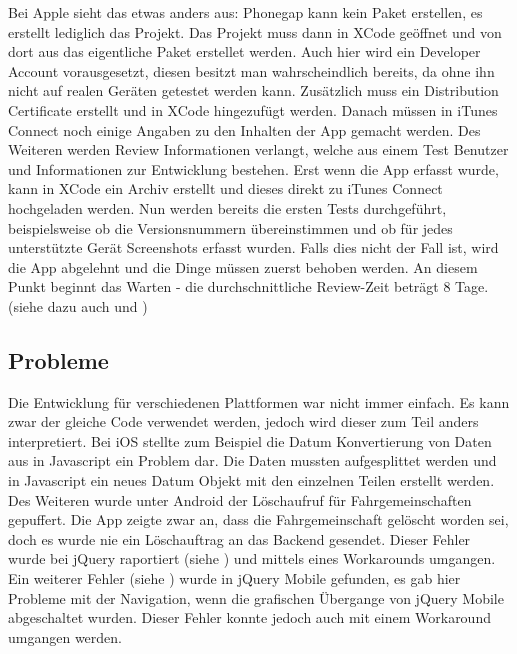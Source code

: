 Bei Apple sieht das etwas anders aus: Phonegap kann kein Paket erstellen, es erstellt lediglich das Projekt. Das Projekt muss dann in XCode geöffnet und von dort aus das eigentliche Paket erstellet werden. Auch hier wird ein Developer Account vorausgesetzt, diesen besitzt man wahrscheindlich bereits, da ohne ihn nicht auf realen Geräten getestet werden kann. Zusätzlich muss ein Distribution Certificate erstellt und in XCode hingezufügt werden. Danach müssen in iTunes Connect noch einige Angaben zu den Inhalten der App gemacht werden. Des Weiteren werden Review Informationen verlangt, welche aus einem Test Benutzer und Informationen zur Entwicklung bestehen. Erst wenn die App erfasst wurde, kann in XCode ein Archiv erstellt und dieses direkt zu iTunes Connect hochgeladen werden. Nun werden bereits die ersten Tests durchgeführt, beispielsweise ob die Versionsnummern übereinstimmen und ob für jedes unterstützte Gerät Screenshots erfasst wurden. Falls dies nicht der Fall ist, wird die App abgelehnt und die Dinge müssen zuerst behoben werden. An diesem Punkt beginnt das Warten - die durchschnittliche Review-Zeit beträgt 8 Tage. (siehe dazu auch \cite{apple_prov_apple} und \cite{apple_prov_ralf})

\subsection{Probleme}
Die Entwicklung für verschiedenen Plattformen war nicht immer einfach. Es kann zwar der gleiche Code verwendet werden, jedoch wird dieser zum Teil anders interpretiert. Bei iOS stellte zum Beispiel die Datum Konvertierung von Daten aus  in Javascript ein Problem dar. Die Daten mussten aufgesplittet werden und in Javascript ein neues Datum Objekt mit den einzelnen Teilen erstellt werden. Des Weiteren wurde unter Android der Löschaufruf für Fahrgemeinschaften gepuffert. Die App zeigte zwar an, dass die Fahrgemeinschaft gelöscht worden sei, doch es wurde nie ein Löschauftrag an das Backend gesendet. Dieser Fehler wurde bei jQuery raportiert (siehe \cite{bug_jquery}) und mittels eines Workarounds umgangen. Ein weiterer Fehler (siehe \cite{bug_jquery_mobile}) wurde in jQuery Mobile gefunden, es gab hier Probleme mit der Navigation, wenn die grafischen Übergange von jQuery Mobile abgeschaltet wurden. Dieser Fehler konnte jedoch auch mit einem Workaround umgangen werden.
